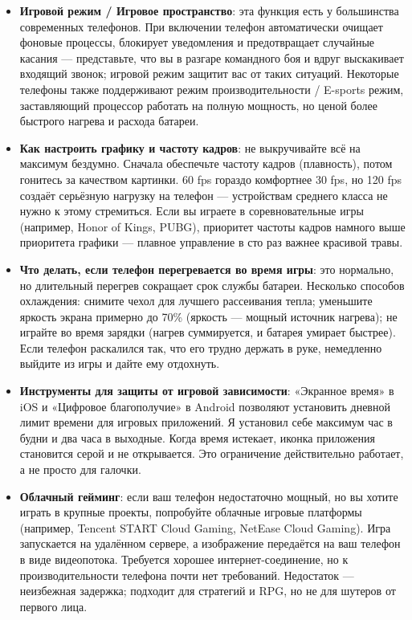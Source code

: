 \begin{itemize}
  \item \textbf{Игровой режим / Игровое пространство}: эта функция есть у большинства современных телефонов. При включении телефон автоматически очищает фоновые процессы, блокирует уведомления и предотвращает случайные касания — представьте, что вы в разгаре командного боя и вдруг выскакивает входящий звонок; игровой режим защитит вас от таких ситуаций. Некоторые телефоны также поддерживают режим производительности / E-sports режим, заставляющий процессор работать на полную мощность, но ценой более быстрого нагрева и расхода батареи.
  \item \textbf{Как настроить графику и частоту кадров}: не выкручивайте всё на максимум бездумно. Сначала обеспечьте частоту кадров (плавность), потом гонитесь за качеством картинки. 60 fps гораздо комфортнее 30 fps, но 120 fps создаёт серьёзную нагрузку на телефон — устройствам среднего класса не нужно к этому стремиться. Если вы играете в соревновательные игры (например, Honor of Kings, PUBG), приоритет частоты кадров намного выше приоритета графики — плавное управление в сто раз важнее красивой травы.
  \item \textbf{Что делать, если телефон перегревается во время игры}: это нормально, но длительный перегрев сокращает срок службы батареи. Несколько способов охлаждения: снимите чехол для лучшего рассеивания тепла; уменьшите яркость экрана примерно до 70\% (яркость — мощный источник нагрева); не играйте во время зарядки (нагрев суммируется, и батарея умирает быстрее). Если телефон раскалился так, что его трудно держать в руке, немедленно выйдите из игры и дайте ему отдохнуть.
  \item \textbf{Инструменты для защиты от игровой зависимости}: «Экранное время» в iOS и «Цифровое благополучие» в Android позволяют установить дневной лимит времени для игровых приложений. Я установил себе максимум час в будни и два часа в выходные. Когда время истекает, иконка приложения становится серой и не открывается. Это ограничение действительно работает, а не просто для галочки.
  \item \textbf{Облачный гейминг}: если ваш телефон недостаточно мощный, но вы хотите играть в крупные проекты, попробуйте облачные игровые платформы (например, Tencent START Cloud Gaming, NetEase Cloud Gaming). Игра запускается на удалённом сервере, а изображение передаётся на ваш телефон в виде видеопотока. Требуется хорошее интернет-соединение, но к производительности телефона почти нет требований. Недостаток — неизбежная задержка; подходит для стратегий и RPG, но не для шутеров от первого лица.
\end{itemize}

